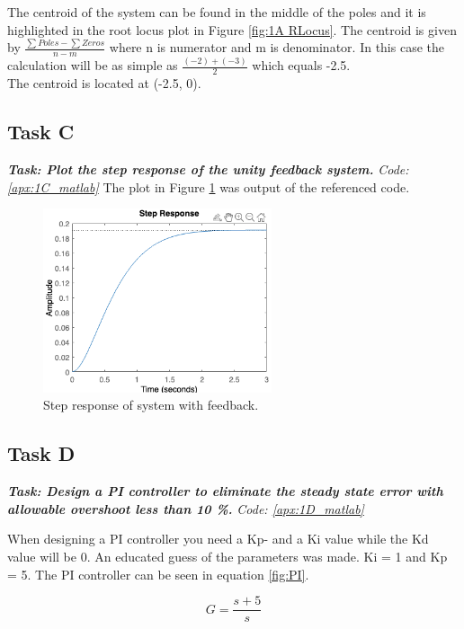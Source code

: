 The centroid of the system can be found in the middle of the poles and it is highlighted in the root locus plot in Figure \ref{fig:1A RLocus}.
The centroid is given by $\frac{\sum Poles - \sum Zeros}{n - m}$ where n is numerator and m is denominator. In this case the calculation will be as simple as $\frac {(-2) + (-3)}{2}$ which equals -2.5. \\
The centroid is located at (-2.5, 0).

\subsection{Task C}
\textbf{\textit{Task: Plot the step response of the unity feedback system.}}
\newline
\textit{Code: \ref{apx:1C_matlab}}
The plot in Figure \ref{fig:1C_StepResponse} was output of the referenced code.

\begin{figure}[h]
    \centering
    \includegraphics[width = 0.6\textwidth]{Images/1C_Step.png}
    \caption{Step response of system with feedback.}
    \label{fig:1C_StepResponse}
\end{figure}

\subsection{Task D}
\textbf{\textit{Task: Design a PI controller to eliminate the steady state error with allowable overshoot less than 10 \%. }}
\newline
\textit{Code: \ref{apx:1D_matlab}}

When designing a PI controller you need a Kp- and a Ki value while the Kd value will be 0. An educated guess of the parameters was made. Ki = 1 and Kp = 5.
The PI controller can be seen in equation \ref{fig:PI}.

\begin{equation}
    G = \frac{s + 5}{s}
    \label{fig:PI}
\end{equation}



